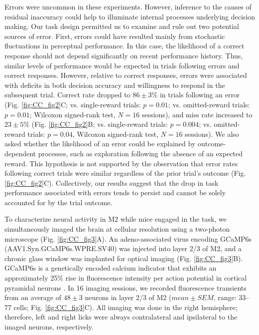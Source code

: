 Errors were uncommon in these experiments. However, inference to the causes of residual inaccuracy could help to illuminate internal processes underlying decision making. Our task design permitted us to examine and rule out two potential sources of error. First, errors could have resulted mainly from stochastic fluctuations in perceptual performance. In this case, the likelihood of a correct response should not depend significantly on recent performance history. Thus, similar levels of performance would be expected in trials following errors and correct responses. However, relative to correct responses, errors were associated with deficits in both decision accuracy and willingness to respond in the subsequent trial. Correct rate dropped to $86 \pm 3\%$ in trials following an error (Fig. \ref{fig:CC_fig2}C; vs. single-reward trials: $p = 0.01$; vs. omitted-reward trials: $p = 0.01$; Wilcoxon signed-rank test, $N = 16$ sessions), and miss rate increased to $23 \pm 5\%$ (Fig. \ref{fig:CC_fig2}B; vs. single-reward trials: $p = 0.004$; vs. omitted-reward trials: $p = 0.04$, Wilcoxon signed-rank test, $N = 16$ sessions). We also asked whether the likelihood of an error could be explained by outcome-dependent processes, such as exploration following the absence of an expected reward. This hypothesis is not supported by the observation that error rates following correct trials were similar regardless of the prior trial’s outcome (Fig. \ref{fig:CC_fig2}C). Collectively, our results suggest that the drop in task performance associated with errors tends to persist and cannot be solely accounted for by the trial outcome.

To characterize neural activity in M2 while mice engaged in the task, we simultaneously imaged the brain at cellular resolution using a two-photon microscope \citep{denk1990two} (Fig. \ref{fig:CC_fig3}A). An adeno-associated virus encoding GCaMP6s (AAV1.Syn.GCaMP6s.WPRE.SV40) was injected into layer 2/3 of M2, and a chronic glass window was implanted for optical imaging (Fig. \ref{fig:CC_fig3}B). GCaMP6s is a genetically encoded calcium indicator that exhibits an approximately 25\% rise in fluorescence intensity per action potential in cortical pyramidal neurons \citep{chen2013ultrasensitive}. In 16 imaging sessions, we recorded fluorescence transients from an average of $48 \pm 3$ neurons in layer 2/3 of M2 ($mean \pm SEM$, range: 33–77 cells; Fig. \ref{fig:CC_fig3}C). All imaging was done in the right hemisphere; therefore, left and right licks were always contralateral and ipsilateral to the imaged neurons, respectively.


